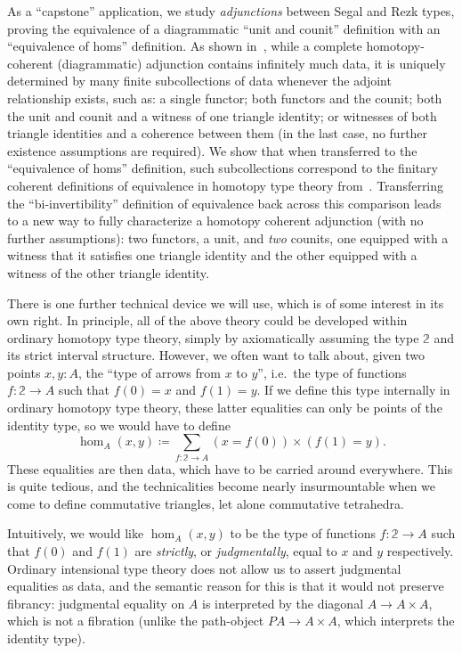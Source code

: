 \documentclass[12pt]{amsart}
\theoremstyle{plain}
\theoremstyle{definition}
\theoremstyle{remark}
\numberwithin{equation}{section}
\newcommand{\defeq}{\coloneqq}
\newcommand{\two}{\mathbb{2}}
\begin{document}
As a ``capstone'' application, we study \emph{adjunctions} between Segal and Rezk types, proving the equivalence of a diagrammatic ``unit and counit'' definition with an ``equivalence of homs'' definition.
As shown in~\cite{RVadj}, while a complete homotopy-coherent (diagrammatic) adjunction contains infinitely much data, it is uniquely determined by many finite subcollections of data {whenever the adjoint relationship exists,} such as: a single functor; both functors and the counit; both the unit and counit and a witness of one triangle identity; or witnesses of both triangle identities and a coherence between them (in the last case, no further existence assumptions are required).
We show that when transferred to the ``equivalence of homs'' definition, such subcollections correspond to the finitary coherent definitions of equivalence in homotopy type theory from~\cite[Chapter 4]{hottbook}.
Transferring the ``bi-invertibility'' definition of equivalence back across this comparison leads to a new way to fully characterize a homotopy coherent adjunction (with no further assumptions): two functors, a unit, and \emph{two} counits, one equipped with a witness that it satisfies one triangle identity and the other equipped with a witness of the other triangle identity.

There is one further technical device we will use, which is of some interest in its own right.
In principle, all of the above theory could be developed within ordinary homotopy type theory, simply by axiom\-atically assuming the type $\two$ and its strict interval structure.
However, we often want to talk about, given two points $x,y:A$, the ``type of arrows from $x$ to $y$'', i.e.\ the type of functions $f:\two\to A$ such that $f(0)=x$ and $f(1)=y$.
If we define this type internally in ordinary homotopy type theory, these latter equalities can only be points of the identity type, so we would have to define
\[ \hom_A(x,y) \defeq \sum_{f:\two\to A} (x=f(0)) \times (f(1)=y). \]
These equalities are then data, which have to be carried around everywhere.
This is quite tedious, and the technicalities become nearly insurmountable when we come to define commutative triangles, let alone commutative tetrahedra.

Intuitively, we would like $\hom_A(x,y)$ to be the type of functions $f:\two\to A$ such that $f(0)$ and $f(1)$ are \emph{strictly}, or \emph{judgmentally}, equal to $x$ and $y$ respectively.
Ordinary intensional type theory does not allow us to assert judgmental equalities as data, and the semantic reason for this is that it would not preserve fibrancy: judgmental equality on $A$ is interpreted by the diagonal $A\to A\times A$, which is not a fibration (unlike the path-object $P A \to A\times A$, which interprets the identity type).
\end{document}
